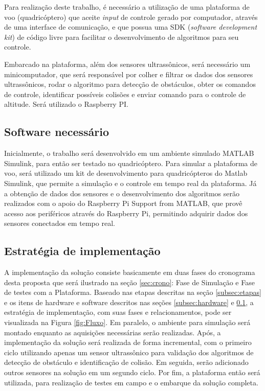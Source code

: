 \documentclass[a4paper, 12pt]{article}
\begin{document}
\label{subsec:hardware}

Para realização deste trabalho, é necessário a utilização de uma plataforma de voo (quadricóptero) que aceite \textit{input} de controle gerado por computador, através de uma interface de comunicação, e que possua uma SDK (\textit{software development kit}) de código livre para facilitar o desenvolvimento de algoritmos para seu controle.

Embarcado na plataforma, além dos sensores ultrassônicos, será necessário um minicomputador, que será responsável por colher e filtrar os dados dos sensores ultrassônicos, rodar o algoritmo para detecção de obstáculos, obter os comandos de controle, identificar possíveis colisões e enviar comando para o controle de altitude. Será utilizado o Raspberry PI. 

\subsection{Software necessário}

\label{subsec:software}

Inicialmente, o trabalho será desenvolvido em um ambiente simulado MATLAB Simulink, para então ser testado no quadricóptero. Para simular a plataforma de voo, será utilizado um kit de desenvolvimento para quadricópteros do Matlab Simulink, que permite a simulação e o controle em tempo real da plataforma. Já a obtenção de dados dos sensores e o desenvolvimento dos algoritmos serão realizados com o apoio do Raspberry Pi Support from MATLAB, que provê acesso aos periféricos através do Raspberry Pi, permitindo adquirir dados dos sensores conectados em tempo real.

\subsection{Estratégia de implementação}

A implementação da solução consiste basicamente em duas fases do cronograma desta proposta que será ilustrado na seção \ref{sec:crono}: Fase de Simulação e Fase de testes com a Plataforma. Baseado nas etapas descritas na seção \ref{subsec:etapas} e os itens de hardware e software descritos nas seções \ref{subsec:hardware} e \ref{subsec:software}, a estratégia de implementação, com suas fases e relacionamentos, pode ser visualizada na Figura \ref{fig:Fluxo}. Em paralelo, o ambiente para simulação será montado enquanto as aquisições necessárias serão realizadas. Após, a implementação da solução será realizada de forma incremental, com o primeiro ciclo utilizando apenas um sensor ultrassônico para validação dos algoritmos de detecção de obstáculo e identificação de colisão. Em seguida, serão adicionado outros sensores na solução em um segundo ciclo. Por fim, a plataforma então será utilizada, para realização de testes em campo e o embarque da solução completa.
  
\end{document}
